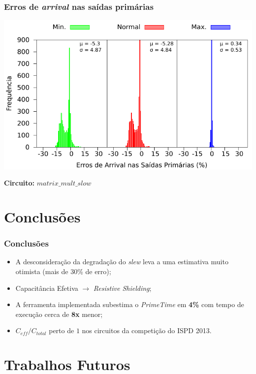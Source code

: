 \documentclass[10pt,a4paper]{beamer}
\begin{document}
		\begin{frame}
			\frametitle{Erros de \textit{arrival} nas saídas primárias}
			\begin{center}
				\includegraphics[width=0.9\linewidth]{img/arrival_error/matrix_mult_puri.pdf}\\
			\end{center}
			\textbf{Circuito:} $matrix\_mult\_slow$
		\end{frame}
			
		
		
		
	
	\section{Conclusões}
	
		\begin{frame}
		\frametitle{Conclusões}
			\begin{itemize}
				\item A desconsideração da degradação do \textit{slew} leva a uma estimativa muito otimista (mais de 30\% de erro);
				
				\item Capacitância Efetiva $\to$ \textit{Resistive Shielding};
				
				\item A ferramenta implementada subestima o \textit{PrimeTime} em \textbf{4\%} com tempo de execução  cerca de \textbf{8x} menor;
				
				\item $C_{eff} / C_{total}$ perto de $1$ nos circuitos da competição do ISPD 2013.
			\end{itemize}
		\end{frame}
	
	\section{Trabalhos Futuros}
		
\end{document}
